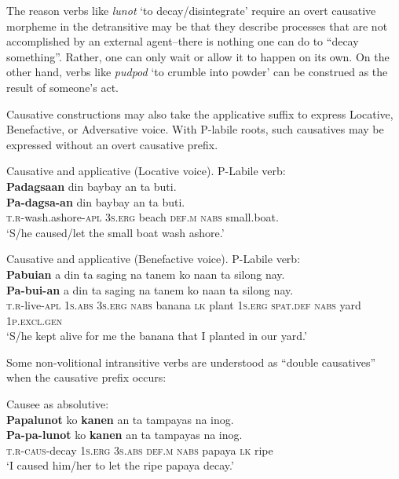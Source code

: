 The reason verbs like \textit{lunot} ‘to decay/disintegrate’ require an overt causative morpheme in the detransitive may be that they describe processes that are not accomplished by an external agent--there is nothing one can do to “decay something”. Rather, one can only wait or allow it to happen on its own. On the other hand, verbs like \textit{pudpod} ‘to crumble into powder’ can be construed as the result of someone’s act.

Causative constructions may also take the applicative suffix to express Locative, Benefactive, or Adversative voice. With P-labile roots, such causatives may be expressed without an overt causative prefix.

\ea
Causative and applicative (Locative voice). P-Labile verb: \\
\textbf{Padagsaan}  din  baybay  an  ta  buti. \\\smallskip
\gll \textbf{Pa-dagsa-an}  din  baybay  an  ta  buti. \\
\textsc{t.r}-wash.ashore-\textsc{apl}  3\textsc{s.erg}  beach  \textsc{def.m}  \textsc{nabs}  small.boat. \\
\glt ‘S/he caused/let the small boat wash ashore.’
\z

\ea
Causative and applicative (Benefactive voice). P-Labile verb: \\
\textbf{Pabuian}  a  din  ta  saging  na  tanem ko  naan  ta  silong  nay. \\\smallskip
\gll \textbf{Pa-bui-an}  a  din  ta  saging  na  tanem ko  naan  ta  silong  nay. \\
\textsc{t.r}-live-\textsc{apl}  1\textsc{s.abs}  3\textsc{s.erg}  \textsc{nabs}  banana  \textsc{lk}  plant
1\textsc{s.erg}  \textsc{spat.def}  \textsc{nabs}  yard  1\textsc{p.excl.gen} \\
\glt `S/he kept alive for me the banana that I planted in our yard.’
\z

Some non-volitional intransitive verbs are understood as “double causatives” when the causative prefix occurs:

\ea
Causee as absolutive: \\
\textbf{Papalunot}  ko  \textbf{kanen}  an  ta  tampayas  na  inog. \\\smallskip
\gll \textbf{Pa-pa-lunot}  ko  \textbf{kanen}  an  ta  tampayas  na  inog. \\
\textsc{t.r}-\textsc{caus}-decay  1\textsc{s.erg}  3\textsc{s.abs}  \textsc{def.m}  \textsc{nabs}  papaya  \textsc{lk}  ripe \\
\glt ‘I caused him/her to let the ripe papaya decay.’
\z

